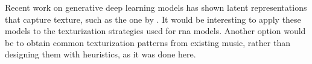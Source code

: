 
Recent work on generative deep learning models has shown
latent representations that capture texture, such as the one
by \textcite{wang2020learning}. It would be interesting to
apply these models to the texturization strategies used for
\gls{rna} models. Another option would be to obtain common
texturization patterns from existing music, rather than
designing them with heuristics, as it was done here.
